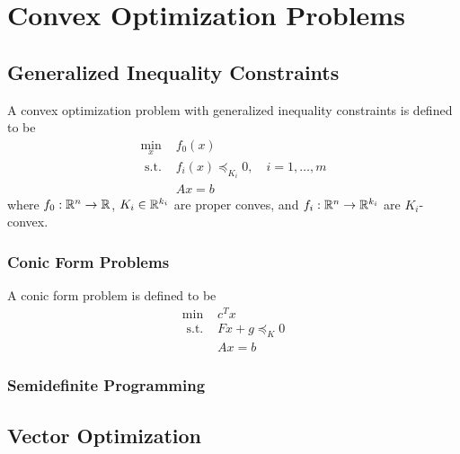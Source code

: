 \chapter{Convex Optimization Problems}

\section{Generalized Inequality Constraints}

\begin{definition}
	A convex optimization problem with generalized inequality constraints is defined to be
	\begin{equation}
		\begin{array}{ll}
			\min_x        & f_{0}(x)                                    \\
			\text{ s.t. } & f_{i}(x)\preceq_{K_{i}}0,\quad i=1,\ldots,m \\
			              & Ax=b
		\end{array}
	\end{equation}
	where $f_{0}:{\mathbb R}^n\rightarrow{\mathbb R}$, $K_i\in{\mathbb R}^{k_i}$ are proper conves, and $f_i:{\mathbb R}^n\rightarrow{\mathbb R}^{k_i}$ are $K_i$-convex.
\end{definition}

\subsection{Conic Form Problems}

\begin{definition}
	A conic form problem is defined to be
	\begin{equation}
		\begin{array}{ll}
			\min          & c^{T}x           \\
			\text{ s.t. } & Fx+g\preceq_{K}0 \\
			              & Ax=b
		\end{array}
	\end{equation}
\end{definition}

\subsection{Semidefinite Programming}

\section{Vector Optimization}

